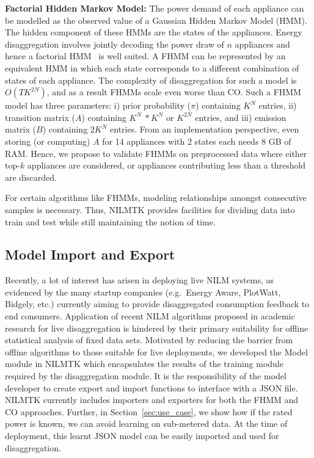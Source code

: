 \documentclass{sig-alternate}
\newcommand{\redcolor}[1]{\textcolor{red}{#1}}
\newcommand{\secref}[1]{Section~\ref{#1}}
\begin{document}
\textbf{Factorial Hidden Markov Model:} The power demand of each appliance can be modelled as the observed value of a Gaussian Hidden Markov Model (HMM). The hidden component of these HMMs are the states of the appliances. Energy disaggregation involves jointly decoding the power draw of $n$ appliances and hence a factorial HMM~\cite{fhmm} is well suited. A FHMM can be represented by an equivalent HMM in which each state corresponds to a different combination of states of each appliance. The complexity of disaggregation for such a model is $O(TK^{2N})$, and as a result FHMMs scale even worse than CO. Such a FHMM model has three parameters: i) prior probability ($\pi$) containing $K^N$ entries, ii) transition matrix ($A$) containing $K^N~*K^N$ or $K^{2N}$ entries, and iii) emission matrix ($B$) containing $2K^N$ entries. From an implementation perspective, even storing (or computing) $A$ for 14 appliances with 2 states each needs 8 GB of RAM. Hence, we propose to validate FHMMs on preprocessed data where either top-$k$ appliances are considered, or appliances contributing less than a threshold are discarded.

For certain algorithms like FHMMs, modeling relationships amongst consecutive samples is necessary. Thus, NILMTK provides facilities for dividing data into train and test while still maintaining the notion of time.
\subsection{Model Import and Export}


\noindent
Recently, a lot of interest has arisen in deploying live NILM systems, as evidenced by the many startup companies (e.g.\ Energy Aware, PlotWatt, Bidgely, etc.) currently aiming to provide disaggregated consumption feedback to end consumers. Application of recent NILM algorithms proposed in academic research for live disaggregation is hindered by their primary suitability for offline statistical analysis of fixed data sets. Motivated by reducing the barrier from offline algorithms to those suitable for live deployments, we developed the Model module in NILMTK which encapsulates the results of the training module required by the disaggregation module. It is the responsibility of the model developer to create export and import functions to interface with a JSON file. NILMTK currently includes importers and exporters for both the FHMM and CO approaches. Further, in \secref{sec:use_case}, we show how if the rated power is known, we can avoid learning on sub-metered data. At the time of deployment, this learnt JSON model can be easily imported and used for disaggregation.
\end{document}
